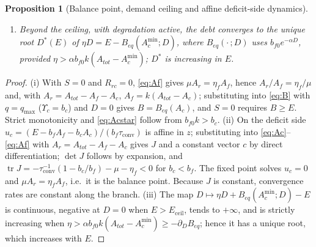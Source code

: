 \documentclass[preprint,12pt,authoryear]{elsarticle}
\newtheorem{proposition}{Proposition}
\newcommand{\Ups}{\Upsilon_c}
\newcommand{\Eceil}{E_{\mathrm{ceil}}}
\newcommand{\Acmin}{A_c^{\min}}
\newcommand{\tconv}{\tau_{\mathrm{conv}}}
\begin{document}
\begin{proposition}[Balance point, demand ceiling and affine deficit-side dynamics]
\begin{enumerate}[label=(\roman*)]
\begin{equation}
\end{equation}
and $\operatorname{tr}J<0$.
$J$ does not depend on $E$ or on the state, $\det J>0$ exactly when $B_{eq}$ is decreasing, and the fixed point of the affine system is the balance point of (i). For $B_{eq}(A_{tot})\le E<\Eceil$ the balance point lies above the typed floor and every trajectory that remains in this regime converges to it at the constant rates given by the eigenvalues of $J$; for $E>\Eceil$ the affine fixed point lies below the floor, so the trajectory approaches the face $A_c=\Acmin$ asymptotically, with a limiting persistent shortfall $S^*=E-\Eceil>0$. The ceiling is a collision of the equilibrium with a face of the admissible set, not a bifurcation of the vector field: there is no second branch, no fold, no hysteresis, and the leading eigenvalue does not tend to zero as $E\to\Eceil$.
\item Beyond the ceiling, with degradation active, the debt converges to the unique root $D^*(E)$ of $\eta D=E-B_{eq}(\Acmin;D)$, where $B_{eq}(\cdot\,;D)$ uses $b_{f0}e^{-\alpha D}$, provided $\eta>\alpha b_{f0}k(A_{tot}-\Acmin)$; $D^*$ is increasing in $E$.
\end{enumerate}
\end{proposition}

\begin{proof}
(i) With $S=0$ and $R_{rc}=0$, \eqref{eq:Af} gives $\mu A_r=\eta_fA_f$, hence $A_r/A_f=\eta_f/\mu$ and, with $A_r=A_{tot}-A_f-A_c$, $A_f=k(A_{tot}-A_c)$; substituting into \eqref{eq:B} with $q=q_{\max}$ ($\Ups=b_c$) and $D=0$ gives $B=B_{eq}(A_c)$, and $S=0$ requires $B\ge E$. Strict monotonicity and \eqref{eq:Acstar} follow from $b_{f0}k>b_c$. (ii) On the deficit side $u_c=(E-b_fA_f-b_cA_c)/(b_f\tconv)$ is affine in $z$; substituting into \eqref{eq:Ac}--\eqref{eq:Af} with $A_r=A_{tot}-A_f-A_c$ gives $J$ and a constant vector $c$ by direct differentiation; $\det J$ follows by expansion, and $\operatorname{tr}J=-\tconv^{-1}(1-b_c/b_f)-\mu-\eta_f<0$ for $b_c<b_f$. The fixed point solves $u_c=0$ and $\mu A_r=\eta_fA_f$, i.e.\ it is the balance point. Because $J$ is constant, convergence rates are constant along the branch. (iii) The map $D\mapsto\eta D+B_{eq}(\Acmin;D)-E$ is continuous, negative at $D=0$ when $E>\Eceil$, tends to $+\infty$, and is strictly increasing when $\eta>\alpha b_{f0}k(A_{tot}-\Acmin)\ge-\partial_DB_{eq}$; hence it has a unique root, which increases with $E$.
\end{proof}
\end{document}
